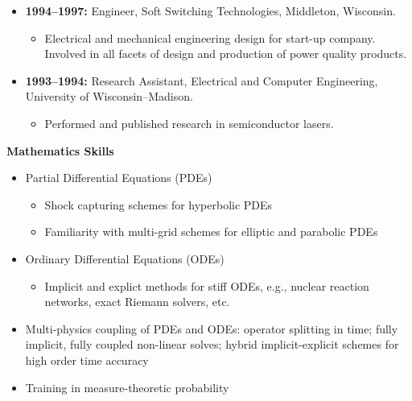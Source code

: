 \documentclass[12pt]{article}
\begin{document}
\begin{itemize}
\item {\bf 1994--1997:} Engineer, Soft Switching Technologies,
  Middleton, Wisconsin.
  \begin{itemize}
  \item Electrical and mechanical engineering design for start-up company.
  Involved in all facets of design and production of power quality
  products.
  \end{itemize}
\item {\bf 1993--1994:} Research Assistant, Electrical and Computer
  Engineering, University of Wisconsin--Madison.
  \begin{itemize}
  \item Performed and published research in semiconductor lasers.
  \end{itemize}
\end{itemize}


\noindent\textbf{Mathematics Skills}
\begin{itemize}
\item Partial Differential Equations (PDEs)
  \begin{itemize}
  \item Shock capturing schemes for hyperbolic PDEs
  \item Familiarity with multi-grid schemes for elliptic and parabolic
    PDEs
  \end{itemize}
\item Ordinary Differential Equations (ODEs)
  \begin{itemize}
  \item Implicit and explict methods for stiff ODEs, e.g., nuclear
    reaction networks, exact Riemann solvers, etc.
  \end{itemize}
\item Multi-physics coupling of PDEs and ODEs: operator splitting in
  time; fully implicit, fully coupled non-linear solves; hybrid
  implicit-explicit schemes for high order time accuracy
\item Training in measure-theoretic probability
\end{itemize}
\end{document}
